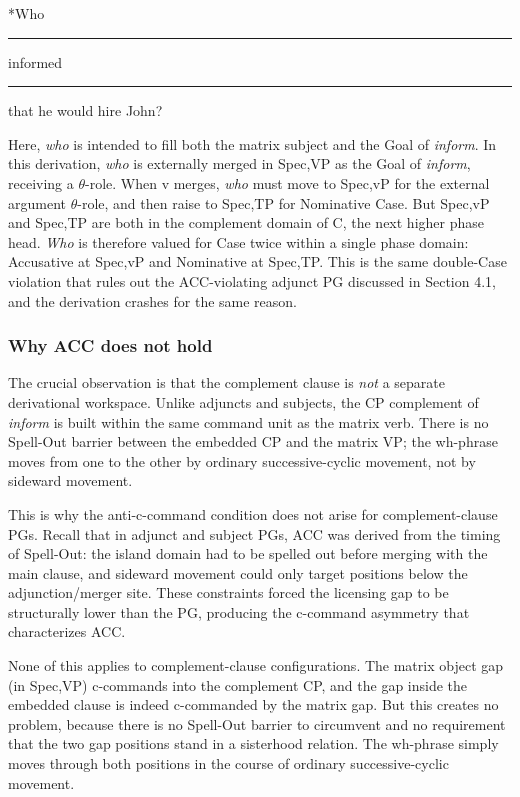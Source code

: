 \documentclass[12pt]{article}
\newcommand{\gap}{\rule{1.25em}{.5pt}} %
\begin{document}
\ex \label{ex4.3_bad2}
*Who \gap{} informed \gap{} that he would hire John?
\xe

\noindent
Here, \textit{who} is intended to fill both the matrix subject and the Goal of \textit{inform}. In this derivation, \textit{who} is externally merged in Spec,VP as the Goal of \textit{inform}, receiving a $\theta$-role. When v merges, \textit{who} must move to Spec,vP for the external argument $\theta$-role, and then raise to Spec,TP for Nominative Case. But Spec,vP and Spec,TP are both in the complement domain of C, the next higher phase head. \textit{Who} is therefore valued for Case twice within a single phase domain: Accusative at Spec,vP and Nominative at Spec,TP. This is the same double-Case violation that rules out the ACC-violating adjunct PG discussed in Section 4.1, and the derivation crashes for the same reason.

\subsubsection{Why ACC does not hold}

The crucial observation is that the complement clause is \textit{not} a separate derivational workspace. Unlike adjuncts and subjects, the CP complement of \textit{inform} is built within the same command unit as the matrix verb. There is no Spell-Out barrier between the embedded CP and the matrix VP; the wh-phrase moves from one to the other by ordinary successive-cyclic movement, not by sideward movement.

This is why the anti-c-command condition does not arise for complement-clause PGs. Recall that in adjunct and subject PGs, ACC was derived from the timing of Spell-Out: the island domain had to be spelled out before merging with the main clause, and sideward movement could only target positions below the adjunction/merger site. These constraints forced the licensing gap to be structurally lower than the PG, producing the c-command asymmetry that characterizes ACC.

None of this applies to complement-clause configurations. The matrix object gap (in Spec,VP) c-commands into the complement CP, and the gap inside the embedded clause is indeed c-commanded by the matrix gap. But this creates no problem, because there is no Spell-Out barrier to circumvent and no requirement that the two gap positions stand in a sisterhood relation. The wh-phrase simply moves through both positions in the course of ordinary successive-cyclic movement.
\end{document}
